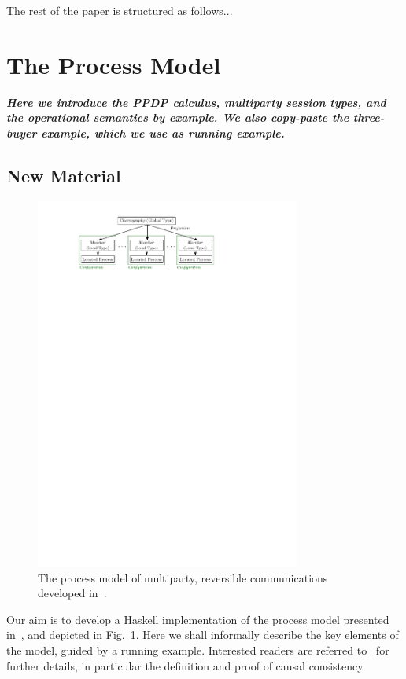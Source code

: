 \documentclass[runningheads,plain]{llncs}
\begin{document}
The rest of the paper is structured as follows...

\section{The Process Model}
\textbf{\emph{Here we introduce the PPDP calculus, multiparty session types, and the operational semantics by example. We also copy-paste the three-buyer example, which we use as running example.}}

\subsection{New Material}
\begin{figure}
\begin{center}
    \includegraphics[width=8.7cm]{./img/figmodel.pdf}
\end{center}
\vspace{-4mm}
\caption{The process model of multiparty, reversible communications developed in~\cite{DBLP:conf/ppdp/MezzinaP17}.}\label{f:model}
\end{figure}

Our aim is to develop a Haskell implementation of the process model presented in~\cite{DBLP:conf/ppdp/MezzinaP17}, and depicted in Fig.~\ref{f:model}. 
Here we shall  informally describe the key elements of the model, guided by a running example. Interested readers are referred to~\cite{DBLP:conf/ppdp/MezzinaP17} for further details, in particular the definition and proof of causal consistency. 
\end{document}
